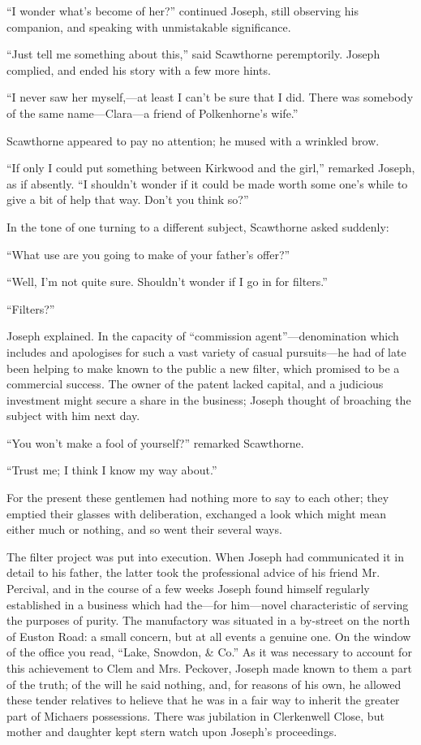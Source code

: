 ``I wonder what's become of her?'' continued Joseph, still observing his
companion, and speaking with unmistakable significance.

``Just tell me something about this,'' said Scawthorne peremptorily.
Joseph complied, and ended his story with a few more hints.

{\protect\hypertarget{190}{}{}}``I never saw her myself,---at least I
can't be sure that I did. There was somebody of the same
name---Clara---a friend of Polkenhorne's wife.''

Scawthorne appeared to pay no attention; he mused with a wrinkled brow.

``If only I could put something between Kirkwood and the girl,''
remarked Joseph, as if absently. ``I shouldn't wonder if it could be
made worth some one's while to give a bit of help that way. Don't you
think so?''

In the tone of one turning to a different subject, Scawthorne asked
suddenly:

``What use are you going to make of your father's offer?''

``Well, I'm not quite sure. Shouldn't wonder if I go in for filters.''

``Filters?''

Joseph explained. In the capacity of ``commission agent''---denomination
which includes and apologises for such a vast variety of casual
pursuits---he had of late been helping to make known to the public a new
filter, which promised to be a commercial success.
{\protect\hypertarget{191}{}{}}The owner of the patent lacked capital,
and a judicious investment might secure a share in the business; Joseph
thought of broaching the subject with him next day.

``You won't make a fool of yourself?'' remarked Scawthorne.

``Trust me; I think I know my way about.''

For the present these gentlemen had nothing more to say to each other;
they emptied their glasses with deliberation, exchanged a look which
might mean either much or nothing, and so went their several ways.

The filter project was put into execution. When Joseph had communicated
it in detail to his father, the latter took the professional advice of
his friend Mr. Percival, and in the course of a few weeks Joseph found
himself regularly established in a business which had the---for
him---novel characteristic of serving the purposes of purity. The
manufactory was situated in a by-street on the north of Euston Road: a
small concern, but at all events a genuine one. On the window of the
office you read, ``Lake, Snowdon, \& Co.'' As it was necessary to
account for this {\protect\hypertarget{192}{}{}}achievement to Clem and
Mrs. Peckover, Joseph made known to them a part of the truth; of the
will he said nothing, and, for reasons of his own, he allowed these
tender relatives to helieve that he was in a fair way to inherit the
greater part of Michaers possessions. There was jubilation in
Clerkenwell Close, but mother and daughter kept stern watch upon
Joseph's proceedings.

